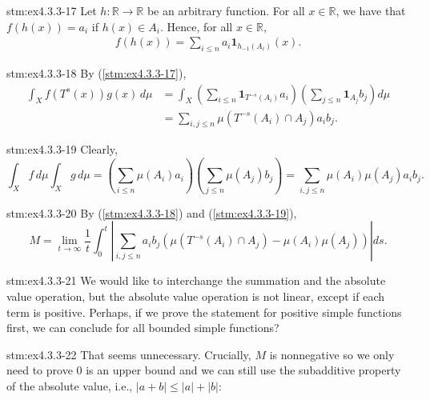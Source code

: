 \begin{statement}{stm:ex4.3.3-17}
Let $h: \mathbb{R} \to \mathbb{R}$ be an arbitrary function. For all $x \in \mathbb{R}$, we have that $f(h(x)) = a_i$ if $h(x) \in A_i$. Hence, for all $x \in \mathbb{R}$,
\begin{align*}
f(h(x)) = \sum_{i \leq n} a_i \mathbf{1}_{h_{-1}(A_i)}(x).
\end{align*}

\end{statement}

\begin{statement}{stm:ex4.3.3-18}
By (\ref{stm:ex4.3.3-17}),
\begin{align*}
\int_X f(T^s(x))g(x) \, d\mu &= \int_X \left( \sum_{i \leq n} \mathbf{1}_{T^{-s}(A_i)} a_i \right) \left( \sum_{j \leq n} \mathbf{1}_{A_j} b_j \right) d\mu \\
&= \sum_{i,j \leq n} \mu(T^{-s}(A_i) \cap A_j) a_i b_j.
\end{align*}
\end{statement}

\begin{statement}{stm:ex4.3.3-19}
Clearly,
\[
\int_X f \, d\mu \int_X g \, d\mu = \left( \sum_{i \leq n} \mu(A_i) a_i \right) \left( \sum_{j \leq n} \mu(A_j) b_j \right) = \sum_{i,j \leq n} \mu(A_i)\mu(A_j) a_i b_j.
\]
\end{statement}

\begin{statement}{stm:ex4.3.3-20}
By (\ref{stm:ex4.3.3-18}) and (\ref{stm:ex4.3.3-19}),
\[
M= \lim_{t \to \infty} \frac{1}{t} \int_0^t \left| \sum_{i,j \leq n} a_i b_j \left( \mu(T^{-s}(A_i) \cap A_j) - \mu(A_i)\mu(A_j) \right) \right| ds.
\]
\end{statement}

\begin{explanation}{stm:ex4.3.3-21}
We would like to interchange the summation and the absolute value operation, but the absolute value operation is not linear, except if each term is positive. Perhaps, if we prove the statement for positive simple functions first, we can conclude for all bounded simple functions?
\end{explanation}

\begin{explanation}{stm:ex4.3.3-22}
That seems unnecessary. Crucially, $M$ is nonnegative so we only need to prove $0$ is an upper bound and we can still use the subadditive property of the absolute value, i.e., $|a + b| \leq |a| + |b|$:
\end{explanation}

